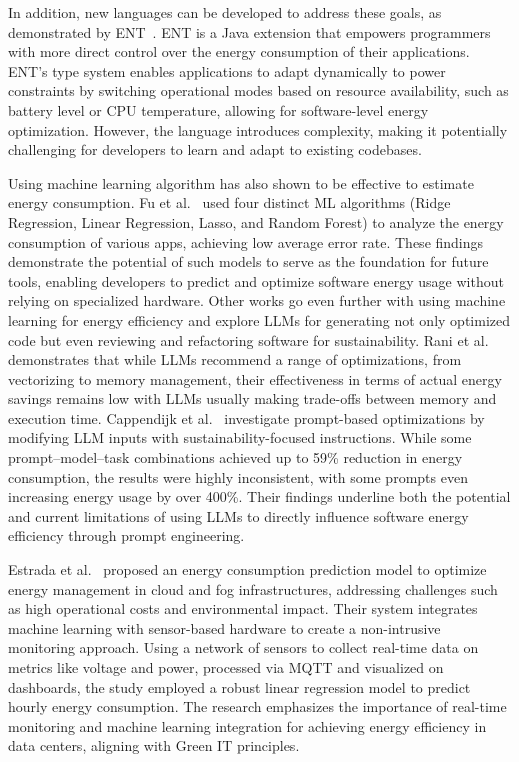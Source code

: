 In addition, new languages can be developed to address these goals, as demonstrated by ENT~\cite{10.1145/3062341.3062356}. ENT is a Java extension that empowers programmers with more direct control over the energy consumption of their applications. ENT’s type system enables applications to adapt dynamically to power constraints by switching operational modes based on resource availability, such as battery level or CPU temperature, allowing for software-level energy optimization. However, the language introduces complexity, making it potentially challenging for developers to learn and adapt to existing codebases. 

Using machine learning algorithm has also shown to be effective to estimate energy consumption. Fu et al.~\cite{8726531} used four distinct ML algorithms (Ridge Regression, Linear Regression, Lasso, and Random Forest) to analyze the energy consumption of various apps, achieving low average error rate. These findings demonstrate the potential of such models to serve as the foundation for future tools, enabling developers to predict and optimize software energy usage without relying on specialized hardware. Other works go even further with using machine learning for energy efficiency and explore LLMs for generating not only optimized code but even reviewing and refactoring software for sustainability. Rani et al.~\cite{rani2025can} demonstrates that while LLMs recommend a range of optimizations, from vectorizing to memory management, their effectiveness in terms of actual energy savings remains low with LLMs usually making trade-offs between memory and execution time. Cappendijk et al.~\cite{cappendijk2024generating} investigate prompt-based optimizations by modifying LLM inputs with sustainability-focused instructions. While some prompt–model–task combinations achieved up to 59\% reduction in energy consumption, the results were highly inconsistent, with some prompts even increasing energy usage by over 400\%. Their findings underline both the potential and current limitations of using LLMs to directly influence software energy efficiency through prompt engineering. 


Estrada et al.~\cite{estrada2022learning} proposed an energy consumption prediction model to optimize energy management in cloud and fog infrastructures, addressing challenges such as high operational costs and environmental impact. Their system integrates machine learning with sensor-based hardware to create a non-intrusive monitoring approach. Using a network of sensors to collect real-time data on metrics like voltage and power, processed via MQTT and visualized on dashboards, the study employed a robust linear regression model to predict hourly energy consumption. The research emphasizes the importance of real-time monitoring and machine learning integration for achieving energy efficiency in data centers, aligning with Green IT principles.

